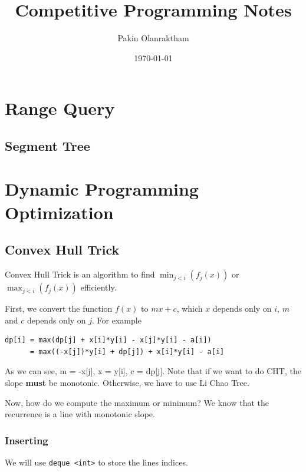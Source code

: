 \documentclass[12pt,a4paper]{article}
\begin{document}
\title{Competitive Programming Notes}
\author{Pakin Olanraktham}
\date{\today}

\maketitle

\newpage

\tableofcontents
\newpage


\section{Range Query}
\subsection{Segment Tree}

\section{Dynamic Programming Optimization}
\subsection{Convex Hull Trick}

Convex Hull Trick is an algorithm to find $\min_{j < i}(f_j(x))$ or $\max_{j < i}(f_j(x))$ efficiently.

First, we convert the function $f(x)$ to $mx+c$, which $x$ depends only on $i$, $m$ and $c$ depends only on $j$. For example

\begin{lstlisting}
dp[i] = max(dp[j] + x[i]*y[i] - x[j]*y[i] - a[i])
      = max((-x[j])*y[i] + dp[j]) + x[i]*y[i] - a[i]
\end{lstlisting}

As we can see, m = -x[j], x = y[i], c = dp[j]. Note that if we want to do CHT, the slope \textbf{must} be monotonic. Otherwise, we have to use Li Chao Tree.

Now, how do we compute the maximum or minimum? We know that the recurrence is a line with monotonic slope.

\subsubsection{Inserting}

We will use \texttt{deque <int>} to store the lines indices.
\end{document}
